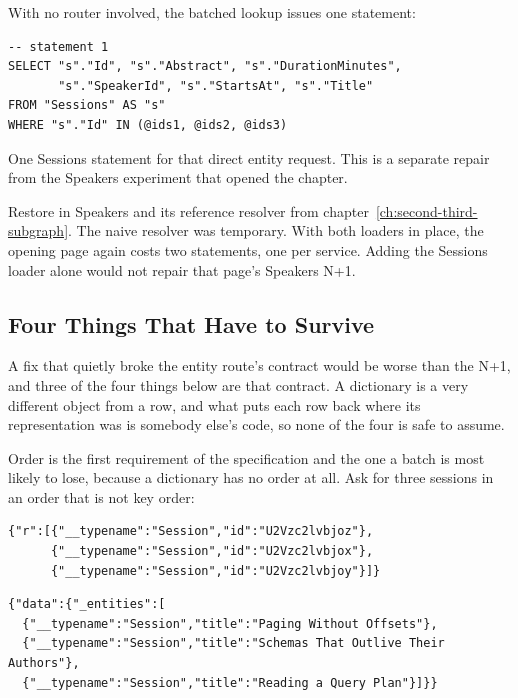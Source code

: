 With no router involved, the batched lookup issues one statement:

\begin{verbatim}
-- statement 1
SELECT "s"."Id", "s"."Abstract", "s"."DurationMinutes",
       "s"."SpeakerId", "s"."StartsAt", "s"."Title"
FROM "Sessions" AS "s"
WHERE "s"."Id" IN (@ids1, @ids2, @ids3)
\end{verbatim}

%
One Sessions statement for that direct entity request. This is a separate
repair from the Speakers experiment that opened the chapter.

Restore  in Speakers and its reference resolver
from chapter~\ref{ch:second-third-subgraph}. The naive resolver was temporary.
With both loaders in place, the opening
page again costs two statements, one per service. Adding the Sessions loader
alone would not repair that page's Speakers N+1.

\subsection{Four Things That Have to Survive}

%
A fix that quietly broke the entity route's contract would be worse than the
N+1, and three of the four things below are that contract. A dictionary is a
very different object from a row, and what puts each row back where its
representation was is somebody else's code, so none of the four is safe to
assume.

%
Order is the first requirement of the specification and the one a batch is most
likely to lose, because a dictionary has no order at all. Ask for three
sessions in an order that is not key order:

\begin{verbatim}
{"r":[{"__typename":"Session","id":"U2Vzc2lvbjoz"},
      {"__typename":"Session","id":"U2Vzc2lvbjox"},
      {"__typename":"Session","id":"U2Vzc2lvbjoy"}]}
\end{verbatim}

\begin{verbatim}
{"data":{"_entities":[
  {"__typename":"Session","title":"Paging Without Offsets"},
  {"__typename":"Session","title":"Schemas That Outlive Their Authors"},
  {"__typename":"Session","title":"Reading a Query Plan"}]}}
\end{verbatim}

